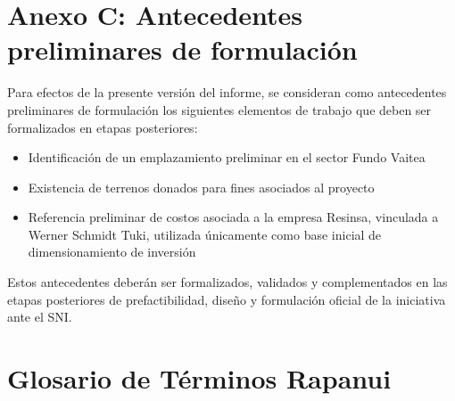 \documentclass[12pt, a4paper]{article}
\begin{document}
\section*{Anexo C: Antecedentes preliminares de formulación}

Para efectos de la presente versión del informe, se consideran como antecedentes
preliminares de formulación los siguientes elementos de trabajo que deben ser
formalizados en etapas posteriores:

\begin{itemize}[leftmargin=*, itemsep=3pt]
  \item Identificación de un emplazamiento preliminar en el sector Fundo Vaitea
  \item Existencia de terrenos donados para fines asociados al proyecto
  \item Referencia preliminar de costos asociada a la empresa Resinsa, vinculada
        a Werner Schmidt Tuki, utilizada únicamente como base inicial de
        dimensionamiento de inversión
\end{itemize}

Estos antecedentes deberán ser formalizados, validados y complementados en las
etapas posteriores de prefactibilidad, diseño y formulación oficial de la
iniciativa ante el SNI.

\newpage
\section*{Glosario de Términos Rapanui}
\end{document}
